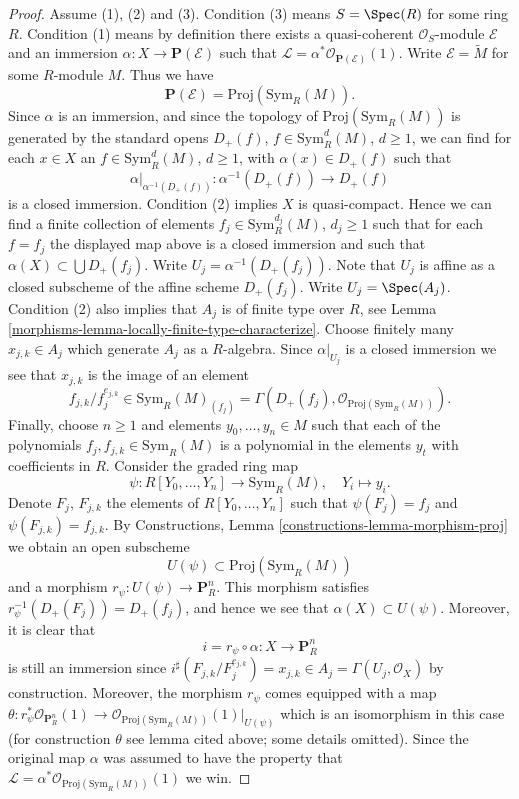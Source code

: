 \begin{proof}

Assume (1), (2) and (3).
Condition (3) means $S = \Spec(R)$ for some ring $R$.
Condition (1) means by definition
there exists a quasi-coherent $\mathcal{O}_S$-module
$\mathcal{E}$ and an immersion $\alpha : X \to \mathbf{P}(\mathcal{E})$
such that $\mathcal{L} = \alpha^*\mathcal{O}_{\mathbf{P}(\mathcal{E})}(1)$.
Write $\mathcal{E} = \widetilde{M}$ for some $R$-module $M$.
Thus we have
$$
\mathbf{P}(\mathcal{E}) = \text{Proj}(\text{Sym}_R(M)).
$$
Since $\alpha$ is an immersion, and since the topology of
$\text{Proj}(\text{Sym}_R(M))$ is generated by the standard
opens $D_{+}(f)$, $f \in \text{Sym}_R^d(M)$, $d \geq 1$,
we can find for each $x \in X$ an
$f \in \text{Sym}_R^d(M)$, $d \geq 1$, with $\alpha(x) \in D_{+}(f)$
such that
$$
\alpha|_{\alpha^{-1}(D_{+}(f))} : \alpha^{-1}(D_{+}(f)) \to D_{+}(f)
$$
is a closed immersion.
Condition (2) implies $X$ is quasi-compact. Hence we can find
a finite collection of elements
$f_j \in \text{Sym}_R^{d_j}(M)$, $d_j \geq 1$
such that for each $f = f_j$ the displayed map above
is a closed immersion and such that $\alpha(X) \subset \bigcup D_{+}(f_j)$.
Write $U_j = \alpha^{-1}(D_{+}(f_j))$. Note that $U_j$ is affine
as a closed subscheme of the affine scheme $D_{+}(f_j)$.
Write $U_j = \Spec(A_j)$. Condition (2) also implies that
$A_j$ is of finite type over $R$, see
Lemma \ref{morphisms-lemma-locally-finite-type-characterize}.
Choose finitely many $x_{j, k} \in A_j$ which
generate $A_j$ as a $R$-algebra. Since $\alpha|_{U_j}$ is a closed
immersion we see that $x_{j, k}$ is the image of an element
$$
f_{j, k}/f_j^{e_{j, k}} \in \text{Sym}_R(M)_{(f_j)}
=
\Gamma(D_{+}(f_j), \mathcal{O}_{\text{Proj}(\text{Sym}_R(M))}).
$$
Finally, choose $n \geq 1$ and elements $y_0, \ldots, y_n \in M$ such that each
of the polynomials $f_j, f_{j, k} \in \text{Sym}_R(M)$ is a polynomial
in the elements $y_t$ with coefficients in $R$.
Consider the graded ring map
$$
\psi : R[Y_0, \ldots, Y_n] \longrightarrow \text{Sym}_R(M),
\quad Y_i \longmapsto y_i.
$$
Denote $F_j$, $F_{j, k}$ the elements of $R[Y_0, \ldots, Y_n]$ such
that $\psi(F_j) = f_j$ and $\psi(F_{j, k}) = f_{j, k}$.
By Constructions, Lemma \ref{constructions-lemma-morphism-proj}
we obtain an open subscheme
$$
U(\psi) \subset \text{Proj}(\text{Sym}_R(M))
$$
and a morphism
$r_\psi : U(\psi) \to \mathbf{P}^n_R$. This morphism
satisfies $r_\psi^{-1}(D_{+}(F_j)) = D_{+}(f_j)$, and hence we see
that $\alpha(X) \subset U(\psi)$. Moreover, it is clear
that
$$
i = r_\psi \circ \alpha : X \longrightarrow \mathbf{P}^n_R
$$
is still an immersion since
$i^\sharp(F_{j, k}/F_j^{e_{j, k}}) = x_{j, k} \in
A_j = \Gamma(U_j, \mathcal{O}_X)$
by construction. Moreover, the morphism $r_\psi$ comes
equipped with a map
$\theta : r_\psi^*\mathcal{O}_{\mathbf{P}^n_R}(1)
\to \mathcal{O}_{\text{Proj}(\text{Sym}_R(M))}(1)|_{U(\psi)}$
which is an isomorphism in this case (for construction $\theta$
see lemma cited above; some details omitted).
Since the original map $\alpha$ was assumed to have the
property that
$\mathcal{L} = \alpha^*\mathcal{O}_{\text{Proj}(\text{Sym}_R(M))}(1)$
we win.
\end{proof}

